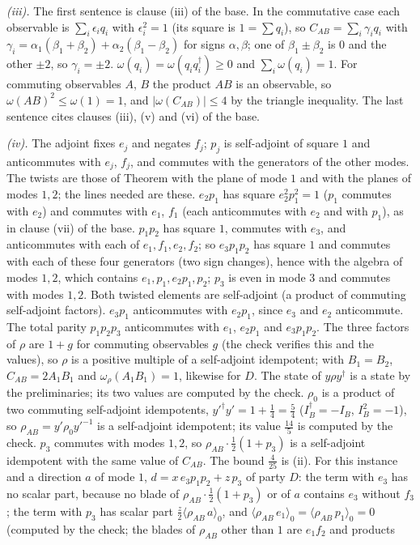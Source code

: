 \emph{(iii).} The first sentence is clause (iii) of the base. In the commutative case each observable is $\sum_{i}\epsilon_{i}q_{i}$ with $\epsilon_{i}^{2} = 1$ (its square is $1 = \sum q_{i}$), so $C_{AB} = \sum_{i}\gamma_{i}q_{i}$ with $\gamma_{i} = \alpha_{1}(\beta_{1} + \beta_{2}) + \alpha_{2}(\beta_{1} - \beta_{2})$ for signs $\alpha, \beta$; one of $\beta_{1} \pm \beta_{2}$ is $0$ and the other $\pm 2$, so $\gamma_{i} = \pm 2$. $\omega(q_{i}) = \omega(q_{i}q_{i}^{\dagger}) \ge 0$ and $\sum_{i}\omega(q_{i}) = 1$. For commuting observables $A$, $B$ the product $AB$ is an observable, so $\omega(AB)^{2} \le \omega(1) = 1$, and $|\omega(C_{AB})| \le 4$ by the triangle inequality. The last sentence cites clauses (iii), (v) and (vi) of the base.

\emph{(iv).} The adjoint fixes $e_{j}$ and negates $f_{j}$; $p_{j}$ is self-adjoint of square $1$ and anticommutes with $e_{j}$, $f_{j}$, and commutes with the generators of the other modes. The twists are those of Theorem  with the plane of mode $1$ and with the planes of modes $1, 2$; the lines needed are these. $e_{2}p_{1}$ has square $e_{2}^{2}p_{1}^{2} = 1$ ($p_{1}$ commutes with $e_{2}$) and commutes with $e_{1}$, $f_{1}$ (each anticommutes with $e_{2}$ and with $p_{1}$), as in clause (vii) of the base. $p_{1}p_{2}$ has square $1$, commutes with $e_{3}$, and anticommutes with each of $e_{1}, f_{1}, e_{2}, f_{2}$; so $e_{3}p_{1}p_{2}$ has square $1$ and commutes with each of these four generators (two sign changes), hence with the algebra of modes $1, 2$, which contains $e_{1}, p_{1}, e_{2}p_{1}, p_{2}$; $p_{3}$ is even in mode $3$ and commutes with modes $1, 2$. Both twisted elements are self-adjoint (a product of commuting self-adjoint factors). $e_{3}p_{1}$ anticommutes with $e_{2}p_{1}$, since $e_{3}$ and $e_{2}$ anticommute. The total parity $p_{1}p_{2}p_{3}$ anticommutes with $e_{1}$, $e_{2}p_{1}$ and $e_{3}p_{1}p_{2}$. The three factors of $\rho$ are $1 + g$ for commuting observables $g$ (the check verifies this and the values), so $\rho$ is a positive multiple of a self-adjoint idempotent; with $B_{1} = B_{2}$, $C_{AB} = 2A_{1}B_{1}$ and $\omega_{\rho}(A_{1}B_{1}) = 1$, likewise for $D$. The state of $y\rho y^{\dagger}$ is a state by the preliminaries; its two values are computed by the check. $\rho_{0}$ is a product of two commuting self-adjoint idempotents, $y'^{\dagger}y' = 1 + \tfrac14 = \tfrac54$ ($I_{B}^{\dagger} = -I_{B}$, $I_{B}^{2} = -1$), so $\rho_{AB} = y'\rho_{0}y'^{-1}$ is a self-adjoint idempotent; its value $\tfrac{14}{5}$ is computed by the check. $p_{3}$ commutes with modes $1, 2$, so $\rho_{AB}\cdot\tfrac12(1 + p_{3})$ is a self-adjoint idempotent with the same value of $C_{AB}$. The bound $\tfrac{4}{25}$ is (ii). For this instance and a direction $a$ of mode $1$, $d = x\,e_{3}p_{1}p_{2} + z\,p_{3}$ of party $D$: the term with $e_{3}$ has no scalar part, because no blade of $\rho_{AB}\cdot\tfrac12(1 + p_{3})$ or of $a$ contains $e_{3}$ without $f_{3}$; the term with $p_{3}$ has scalar part $\tfrac{z}{2}\langle\rho_{AB}\,a\rangle_{0}$, and $\langle\rho_{AB}\,e_{1}\rangle_{0} = \langle\rho_{AB}\,p_{1}\rangle_{0} = 0$ (computed by the check; the blades of $\rho_{AB}$ other than $1$ are $e_{1}f_{2}$ and products 
